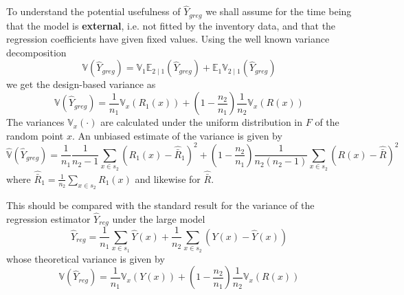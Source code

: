 \documentclass[a4paper,12pt,leqno, titlepage]{article}
\newcommand{\EX}{\mathbb{E}}
\newcommand{\VAR}{\mathbb{V}}
\begin{document}
To understand the potential usefulness of $\hat{Y}_{greg}$ we shall assume for the time being that the model is \textbf{external}, i.e. not fitted by the inventory data, and that the regression coefficients have given fixed values. Using the well known variance decomposition
\begin{equation}\label{conddecomposition}
\VAR(\hat{Y}_{greg})=\VAR_1\EX_{2 \mid 1}(\hat{Y}_{greg})+\EX_1\VAR_{2 \mid 1}(\hat{Y}_{greg})
\end{equation}we get the design-based variance as
\begin{equation}\label{avar1}
\VAR(\hat{Y}_{greg})=\frac{1}{n_1}\VAR_x(R_1(x))+(1-\frac{n_2}{n_1})\frac{1}{n_2}\VAR_x(R(x))
\end{equation}
The variances $\VAR_x( \cdot)$ are calculated under the uniform distribution in $F$ of the random point $x$. An unbiased estimate of the variance is given by
\begin{equation}\label{estvarclassic}
\hat{\VAR}(\hat{Y}_{greg})=\frac{1}{n_1}\frac{1}{n_2-1}\sum_{x\in{s_2}}(R_1(x)-\hat{\bar{R}}_1)^2
+ (1-\frac{n_2}{n_1})\frac{1}{n_2(n_2-1)}\sum_{x\in{s_2}}(R(x)-\hat{\bar{R}})^2
\end{equation}
where $\hat{\bar{R}}_1=\frac{1}{n_2}\sum_{x\in{s_2}}R_1(x)$ and likewise for $\hat{\bar{R}}$.

This should be compared with the standard result for the variance of the regression estimator $\hat{Y}_{reg}$ under the large model
\begin{equation}\label{classicreg}
\hat{Y}_{reg}=\frac{1}{n_1}\sum_{x\in{s}_1}\hat{Y}(x)+\frac{1}{n_2}\sum_{x\in{s}_2}(Y(x)-\hat{Y}(x))
\end{equation}
whose theoretical variance is given by
\begin{equation}\label{avarclassic}
\VAR(\hat{Y}_{reg})=\frac{1}{n_1}\VAR_x(Y(x))+(1-\frac{n_2}{n_1})\frac{1}{n_2}\VAR_x(R(x))
\end{equation}
\end{document}
